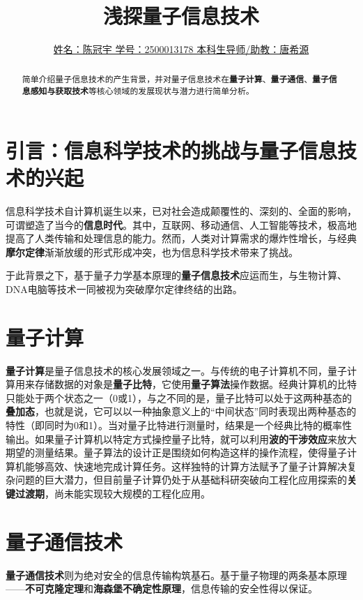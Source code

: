 \documentclass{article}
\title{\textbf{浅探量子信息技术}}
\author{\underline{姓名：陈冠宇 \quad 学号：2500013178  \quad 本科生导师/助教：唐希源}}
\date{}
\begin{document}
\maketitle

\begin{abstract}
简单介绍量子信息技术的产生背景，并对量子信息技术在\textbf{量子计算}、\textbf{量子通信}、\textbf{量子信息感知与获取技术}等核心领域的发展现状与潜力进行简单分析。
\end{abstract}


\section{引言：信息科学技术的挑战与量子信息技术的兴起}

信息科学技术自计算机诞生以来，已对社会造成颠覆性的、深刻的、全面的影响，可谓塑造了当今的\textbf{信息时代}。其中，互联网、移动通信、人工智能等技术，极高地提高了人类传输和处理信息的能力。然而，人类对计算需求的爆炸性增长，与经典\textbf{摩尔定律}渐渐放缓的形式形成冲突，也为信息科学技术带来了挑战。

于此背景之下，基于量子力学基本原理的\textbf{量子信息技术}应运而生，与生物计算、DNA电脑等技术一同被视为突破摩尔定律终结的出路。\cite{tuomi2002lives} 

\section{量子计算}

\textbf{量子计算}是量子信息技术的核心发展领域之一。与传统的电子计算机不同，量子计算用来存储数据的对象是\textbf{量子比特}，它使用\textbf{量子算法}操作数据。经典计算机的比特只能处于两个状态之一（0或1），与之不同的是，量子比特可以处于这两种基态的\textbf{叠加态}，也就是说，它可以以一种抽象意义上的“中间状态”同时表现出两种基态的特性（即同时为0和1）。当对量子比特进行测量时，结果是一个经典比特的概率性输出。如果量子计算机以特定方式操控量子比特，就可以利用\textbf{波的干涉效应}来放大期望的测量结果。量子算法的设计正是围绕如何构造这样的操作流程，使得量子计算机能够高效、快速地完成计算任务。这样独特的计算方法赋予了量子计算解决复杂问题的巨大潜力，但目前量子计算仍处于从基础科研突破向工程化应用探索的\textbf{关键过渡期}，尚未能实现较大规模的工程化应用。

\section{量子通信技术}

\textbf{量子通信技术}则为绝对安全的信息传输构筑基石。基于量子物理的两条基本原理——\textbf{不可克隆定理}和\textbf{海森堡不确定性原理}，信息传输的安全性得以保证。
\end{document}
